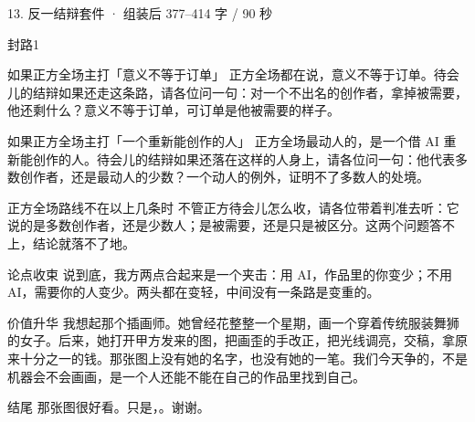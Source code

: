 \documentclass[script,con]{debate}
\begin{document}
\begin{kit}{13. 反一结辩}{套件 · 组装后 377–414 字 / 90 秒}
\begin{pick}{封路}{1}
\begin{module}{如果正方全场主打「意义不等于订单」}
正方全场都在说，意义不等于订单。待会儿的结辩如果还走这条路，请各位问一句：对一个不出名的创作者，拿掉被需要，他还剩什么？意义不等于订单，可订单是他被需要的样子。
\end{module}
\begin{module}{如果正方全场主打「一个重新能创作的人」}
正方全场最动人的，是一个借 AI 重新能创作的人。待会儿的结辩如果还落在这样的人身上，请各位问一句：他代表多数创作者，还是最动人的少数？一个动人的例外，证明不了多数人的处境。
\end{module}
\begin{fallback}{正方全场路线不在以上几条时}
不管正方待会儿怎么收，请各位带着判准去听：它说的是多数创作者，还是少数人；是被需要，还是只是被区分。这两个问题答不上，结论就落不了地。
\end{fallback}
\end{pick}
\begin{fixed}{论点收束}
说到底，我方两点合起来是一个夹击：用 AI，作品里的你变少；不用 AI，需要你的人变少。两头都在变轻，中间没有一条路是变重的。
\end{fixed}
\begin{fixed}{价值升华}
我想起那个插画师。她曾经花整整一个星期，画一个穿着传统服装舞狮的女子。后来，她打开甲方发来的图，把画歪的手改正，把光线调亮，交稿，拿原来十分之一的钱。那张图上没有她的名字，也没有她的一笔。我们今天争的，不是机器会不会画画，是一个人还能不能在自己的作品里找到自己。
\end{fixed}
\begin{fixed}{结尾}
那张图很好看。只是，。谢谢。
\end{fixed}
\end{kit}
\begin{contingency}
\end{contingency}
\end{document}
